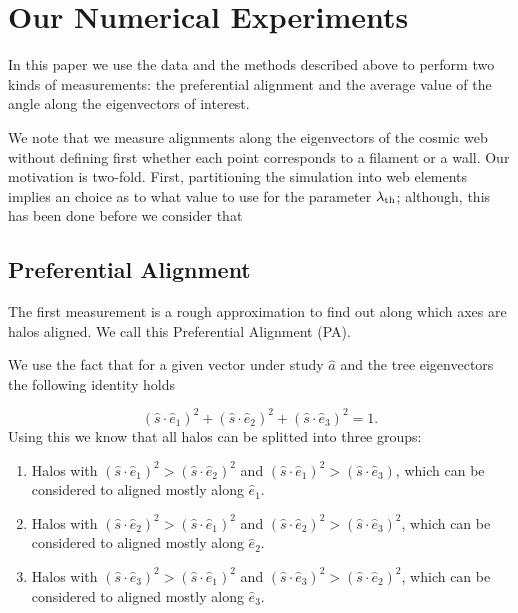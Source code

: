\documentclass[useAMS,usenatbib]{mn2e}
\begin{document}
\section{Our Numerical Experiments}

In this paper we use the data and the methods described above to
perform two kinds of measurements: the preferential alignment and the
average value of the angle along the eigenvectors of interest.

We note that we measure alignments along the eigenvectors of the
cosmic web without defining first whether each point corresponds to a
filament or a wall. Our motivation is two-fold. First, partitioning the
simulation into web elements implies an choice as to what value to use
for the parameter $\lambda_{\rm th}$; although, this has been done
before we consider that 

\subsection{Preferential Alignment}

The first measurement is a rough approximation to find out along which
axes are halos aligned. We call this Preferential Alignment (PA). 

We use the fact that for a given vector under study $\hat{a}$ and the
tree eigenvectors the following identity holds  
 
\begin{equation}
(\hat{s}\cdot\hat{e}_1)^2 +(\hat{s}\cdot\hat{e}_2)^2 +(\hat{s}\cdot\hat{e}_3)^2 =1.
\end{equation}
%
Using this we know that all halos can be splitted into three groups:

\begin{enumerate}
\item Halos with $(\hat{s}\cdot\hat{e}_1)^2> (\hat{s}\cdot\hat{e}_2)^2$
  and $(\hat{s}\cdot\hat{e}_1)^2> (\hat{s}\cdot\hat{e}_3)$, which can
  be considered to aligned mostly along $\hat{e}_1$.
\item Halos with $(\hat{s}\cdot\hat{e}_2)^2> (\hat{s}\cdot\hat{e}_1)^2$
  and $(\hat{s}\cdot\hat{e}_2)^2> (\hat{s}\cdot\hat{e}_3)^2$, which can
  be considered to aligned mostly along $\hat{e}_2$.
\item Halos with $(\hat{s}\cdot\hat{e}_3)^2> (\hat{s}\cdot\hat{e}_1)^2$
  and $(\hat{s}\cdot\hat{e}_3)^2> (\hat{s}\cdot\hat{e}_2)^2$, which can
  be considered to aligned mostly along $\hat{e}_3$.
\end{enumerate}
\end{document}
